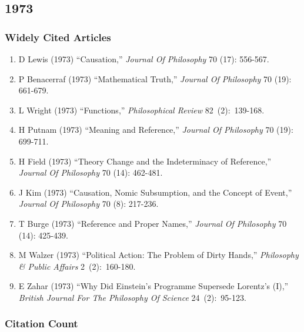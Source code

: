 \documentclass[
  10pt,
  letterpaper,
  DIV=11,
  numbers=noendperiod,
  twoside]{scrartcl}
\providecommand{\tightlist}{%
  \setlength{\itemsep}{0pt}\setlength{\parskip}{0pt}}\usepackage{longtable,booktabs,array}
\begin{document}
\newpage

\subsection{1973}\label{sec-s1973}

\subsubsection*{Widely Cited Articles}\label{widely-cited-articles-16}

\begin{enumerate}
\def\labelenumi{\arabic{enumi}.}
\tightlist
\item
  D Lewis (1973) ``Causation,'' \emph{Journal Of Philosophy} 70 (17):
  556-567.
\item
  P Benacerraf (1973) ``Mathematical Truth,'' \emph{Journal Of
  Philosophy} 70 (19): 661-679.
\item
  L Wright (1973) ``Functions,'' \emph{Philosophical Review}
  82~(2):~139-168.
\item
  H Putnam (1973) ``Meaning and Reference,'' \emph{Journal Of
  Philosophy} 70 (19): 699-711.
\item
  H Field (1973) ``Theory Change and the Indeterminacy of Reference,''
  \emph{Journal Of Philosophy} 70 (14): 462-481.
\item
  J Kim (1973) ``Causation, Nomic Subsumption, and the Concept of
  Event,'' \emph{Journal Of Philosophy} 70 (8): 217-236.
\item
  T Burge (1973) ``Reference and Proper Names,'' \emph{Journal Of
  Philosophy} 70 (14): 425-439.
\item
  M Walzer (1973) ``Political Action: The Problem of Dirty Hands,''
  \emph{Philosophy \& Public Affairs} 2~(2):~160-180.
\item
  E Zahar (1973) ``Why Did Einstein's Programme Supersede Lorentz's
  (I),'' \emph{British Journal For The Philosophy Of Science}
  24~(2):~95-123.
\end{enumerate}

\subsubsection*{Citation Count}\label{sec-count-1973}
\end{document}
